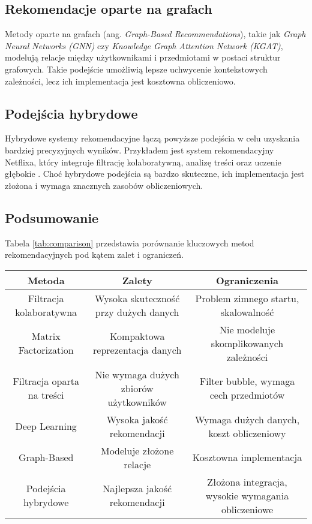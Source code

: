 \documentclass[a4paper,onecolumn]{LTJournalArticle}
\begin{document}
\subsection{Rekomendacje oparte na grafach}
Metody oparte na grafach (ang. \textit{Graph-Based Recommendations}), takie jak \textit{Graph Neural Networks (GNN)} czy \textit{Knowledge Graph Attention Network (KGAT)}, modelują relacje między użytkownikami i przedmiotami w postaci struktur grafowych. Takie podejście umożliwią lepsze uchwycenie kontekstowych zależności, lecz ich implementacja jest kosztowna obliczeniowo.

\subsection{Podejścia hybrydowe}
Hybrydowe systemy rekomendacyjne łączą powyższe podejścia w celu uzyskania bardziej precyzyjnych wyników. Przykładem jest system rekomendacyjny Netflixa, który integruje filtrację kolaboratywną, analizę treści oraz uczenie głębokie \cite{zhou2018deep}. Choć hybrydowe podejścia są bardzo skuteczne, ich implementacja jest złożona i wymaga znacznych zasobów obliczeniowych.

\subsection{Podsumowanie}
Tabela \ref{tab:comparison} przedstawia porównanie kluczowych metod rekomendacyjnych pod kątem zalet i ograniczeń.


\begin{table*}[t]
    \centering
    \begin{tabular}{|c|c|c|}
        \hline
        \textbf{Metoda} & \textbf{Zalety} & \textbf{Ograniczenia} \\
        \hline
        Filtracja kolaboratywna & Wysoka skuteczność przy dużych danych & Problem zimnego startu, skalowalność \\
        \hline
        Matrix Factorization & Kompaktowa reprezentacja danych & Nie modeluje skomplikowanych zależności \\
        \hline
        Filtracja oparta na treści & Nie wymaga dużych zbiorów użytkowników & Filter bubble, wymaga cech przedmiotów \\
        \hline
        Deep Learning & Wysoka jakość rekomendacji & Wymaga dużych danych, koszt obliczeniowy \\
        \hline
        Graph-Based & Modeluje złożone relacje & Kosztowna implementacja \\
        \hline
        Podejścia hybrydowe & Najlepsza jakość rekomendacji & Złożona integracja, wysokie wymagania obliczeniowe \\
        \hline
    \end{tabular}
    \caption{Porównanie metod rekomendacyjnych}
    \label{tab:comparison}
\end{table*}
\end{document}
